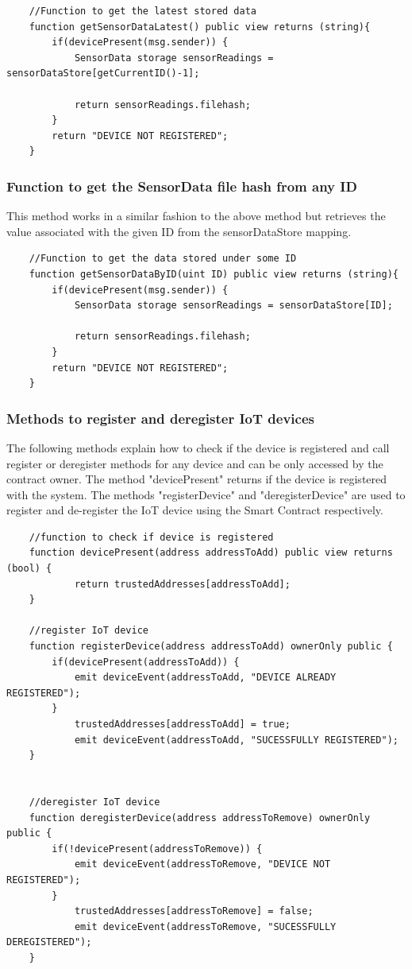 \documentclass[11pt,openright]{report}
\begin{document}
\begin{verbatim}
    //Function to get the latest stored data
    function getSensorDataLatest() public view returns (string){
        if(devicePresent(msg.sender)) {
            SensorData storage sensorReadings = sensorDataStore[getCurrentID()-1];

            return sensorReadings.filehash;
        }
        return "DEVICE NOT REGISTERED";
    }
\end{verbatim}

\subsubsection{Function to get the SensorData file hash from any ID}
This method works in a similar fashion to the above method but retrieves the value associated with the given ID from the sensorDataStore mapping.

\begin{verbatim}
    //Function to get the data stored under some ID
    function getSensorDataByID(uint ID) public view returns (string){
        if(devicePresent(msg.sender)) {
            SensorData storage sensorReadings = sensorDataStore[ID];

            return sensorReadings.filehash;
        }
        return "DEVICE NOT REGISTERED";
    }
\end{verbatim}

\subsubsection{Methods to register and deregister IoT devices}
The following methods explain how to check if the device is registered and call register or deregister methods for any device and can be only accessed by the contract owner. 
The method "devicePresent" returns if the device is registered with the system.
The methods "registerDevice" and "deregisterDevice" are used to register and de-register the IoT device using the Smart Contract respectively.
\begin{verbatim}
    //function to check if device is registered
    function devicePresent(address addressToAdd) public view returns (bool) {
            return trustedAddresses[addressToAdd];
    }
    
    //register IoT device
    function registerDevice(address addressToAdd) ownerOnly public {
        if(devicePresent(addressToAdd)) {
            emit deviceEvent(addressToAdd, "DEVICE ALREADY REGISTERED");
        }
            trustedAddresses[addressToAdd] = true;
            emit deviceEvent(addressToAdd, "SUCESSFULLY REGISTERED");
    }
    
    
    //deregister IoT device
    function deregisterDevice(address addressToRemove) ownerOnly public {
        if(!devicePresent(addressToRemove)) {
            emit deviceEvent(addressToRemove, "DEVICE NOT REGISTERED");
        }
            trustedAddresses[addressToRemove] = false;
            emit deviceEvent(addressToRemove, "SUCESSFULLY DEREGISTERED");
    }
\end{verbatim}
\newpage
\end{document}
